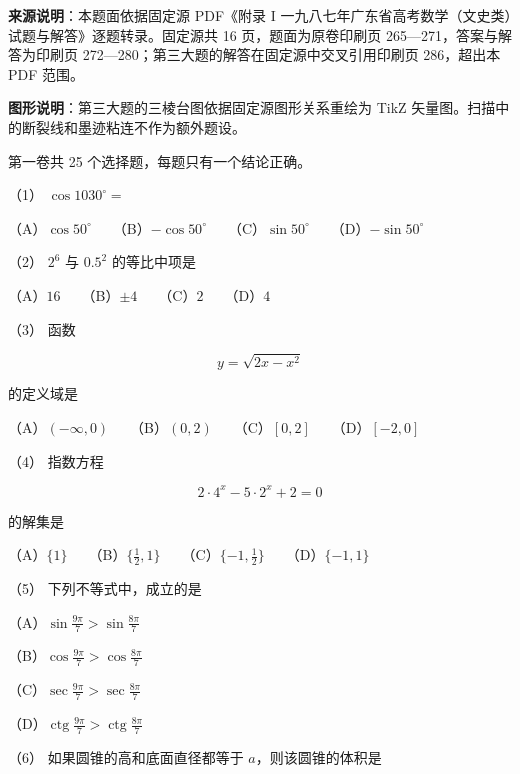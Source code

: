 


\begin{gktip}
\textbf{来源说明}：本题面依据固定源 PDF《附录 I 一九八七年广东省高考数学（文史类）试题与解答》逐题转录。固定源共 16 页，题面为原卷印刷页 265—271，答案与解答为印刷页 272—280；第三大题的解答在固定源中交叉引用印刷页 286，超出本 PDF 范围。

\textbf{图形说明}：第三大题的三棱台图依据固定源图形关系重绘为 TikZ 矢量图。扫描中的断裂线和墨迹粘连不作为额外题设。
\end{gktip}

\begin{question}

第一卷共 25 个选择题，每题只有一个结论正确。

（1） $\cos1030^\circ=$

（A）$\cos50^\circ$　　（B）$-\cos50^\circ$　　（C）$\sin50^\circ$　　（D）$-\sin50^\circ$

（2） $2^6$ 与 $0.5^2$ 的等比中项是

（A）$16$　　（B）$\pm4$　　（C）$2$　　（D）$4$

（3） 函数

\nopagebreak[4]
\[
y=\sqrt{2x-x^2}
\]

的定义域是

（A）$(-\infty,0)$　　（B）$(0,2)$　　（C）$[0,2]$　　（D）$[-2,0]$

（4） 指数方程

\nopagebreak[4]
\[
2\cdot4^x-5\cdot2^x+2=0
\]

的解集是

（A）$\{1\}$　　（B）$\{\frac12,1\}$　　（C）$\{-1,\frac12\}$　　（D）$\{-1,1\}$

（5） 下列不等式中，成立的是

（A）$\displaystyle\sin\frac{9\pi}{7}>\sin\frac{8\pi}{7}$

（B）$\displaystyle\cos\frac{9\pi}{7}>\cos\frac{8\pi}{7}$

（C）$\displaystyle\sec\frac{9\pi}{7}>\sec\frac{8\pi}{7}$

（D）$\displaystyle\operatorname{ctg}\frac{9\pi}{7}>\operatorname{ctg}\frac{8\pi}{7}$

（6） 如果圆锥的高和底面直径都等于 $a$，则该圆锥的体积是


\end{question}
